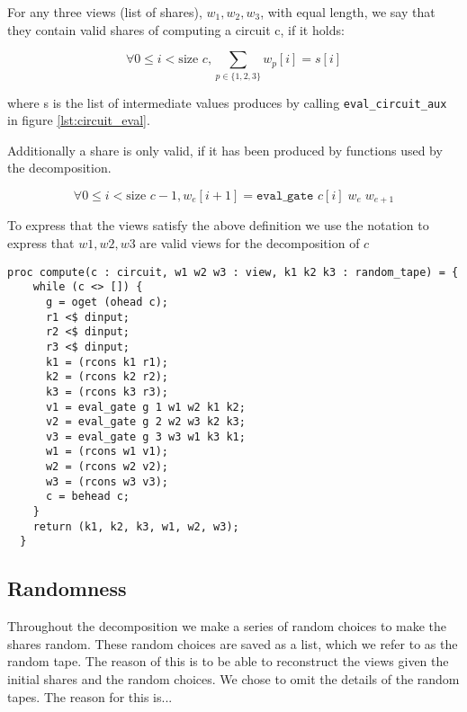 \begin{definition}
  \label{def:decomp:valid_view}
  For any three views (list of shares), $w_{1}, w_{2}, w_{3}$, with equal length, we
  say that they contain valid shares of computing a circuit c, if it holds:

  \begin{equation}
    \label{eq:decomp:view:sum}
    \forall 0 \leq i < \text{size } c,
      \sum_{p \in \{1,2,3\}} w_{p}[i] = s[i]
  \end{equation}

  where s is the list of intermediate values produces by calling
  \texttt{eval\_circuit\_aux} in figure \ref{lst:circuit_eval}.

  Additionally a share is only valid, if it has been produced by functions used
  by the decomposition.

  \begin{equation}
    \label{eq:decomp:valid}
      \forall 0 \leq i < \text{size
                                                   } c - 1,  w_{e}[i+1] = \texttt{eval\_gate } c[i]\; w_{e} \; w_{e+1}
  \end{equation}

  To express that the views satisfy the above definition we use the notation
   to express that $w1, w2, w3$ are valid views for the
  decomposition of $c$

\end{definition}


\begin{lstlisting}[float,label=lst:decomp_aux,caption= Incremental decomposition procedure]
  proc compute(c : circuit, w1 w2 w3 : view, k1 k2 k3 : random_tape) = {
    while (c <> []) {
      g = oget (ohead c);
      r1 <$ dinput;
      r2 <$ dinput;
      r3 <$ dinput;
      k1 = (rcons k1 r1);
      k2 = (rcons k2 r2);
      k3 = (rcons k3 r3);
      v1 = eval_gate g 1 w1 w2 k1 k2;
      v2 = eval_gate g 2 w2 w3 k2 k3;
      v3 = eval_gate g 3 w3 w1 k3 k1;
      w1 = (rcons w1 v1);
      w2 = (rcons w2 v2);
      w3 = (rcons w3 v3);
      c = behead c;
    }
    return (k1, k2, k3, w1, w2, w3);
  }
\end{lstlisting}

\subsection{Randomness}
\label{subsec:decomp:randomness}
Throughout the decomposition we make a series of random choices to make the
shares random. These random choices are saved as a list, which we refer to as
the random tape. The reason of this is to be able to reconstruct the views given
the initial shares and the random choices. We chose to omit the details of the
random tapes. The reason for this is...


